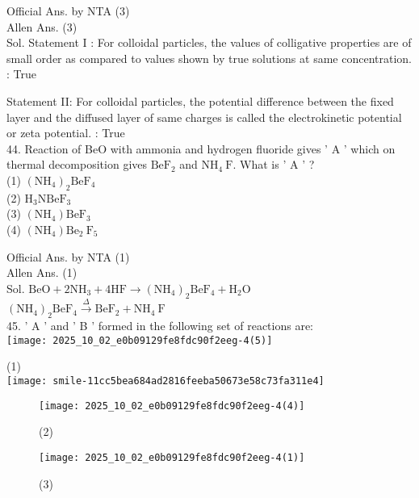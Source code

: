 \documentclass[10pt]{article}
\begin{document}
Official Ans. by NTA (3)\\
Allen Ans. (3)\\
Sol. Statement I : For colloidal particles, the values of colligative properties are of small order as compared to values shown by true solutions at same concentration. : True

Statement II: For colloidal particles, the potential difference between the fixed layer and the diffused layer of same charges is called the electrokinetic potential or zeta potential. : True\\
44. Reaction of BeO with ammonia and hydrogen fluoride gives ' A ' which on thermal decomposition gives \(\mathrm{BeF}_{2}\) and \(\mathrm{NH}_{4} \mathrm{~F}\). What is ' A ' ?\\
(1) \(\left(\mathrm{NH}_{4}\right)_{2} \mathrm{BeF}_{4}\)\\
(2) \(\mathrm{H}_{3} \mathrm{NBeF}_{3}\)\\
(3) \(\left(\mathrm{NH}_{4}\right) \mathrm{BeF}_{3}\)\\
(4) \(\left(\mathrm{NH}_{4}\right) \mathrm{Be}_{2} \mathrm{~F}_{5}\)

Official Ans. by NTA (1)\\
Allen Ans. (1)\\
Sol. \(\mathrm{BeO}+2 \mathrm{NH}_{3}+4 \mathrm{HF} \rightarrow\left(\mathrm{NH}_{4}\right)_{2} \mathrm{BeF}_{4}+\mathrm{H}_{2} \mathrm{O}\)\\
\(\left(\mathrm{NH}_{4}\right)_{2} \mathrm{BeF}_{4} \xrightarrow{\Delta} \mathrm{BeF}_{2}+\mathrm{NH}_{4} \mathrm{~F}\)\\
45. ' A ' and ' B ' formed in the following set of reactions are:\\
\texttt{[image: 2025\_10\_02\_e0b09129fe8fdc90f2eeg-4(5)]}

(1)\\
\texttt{[image: smile-11cc5bea684ad2816feeba50673e58c73fa311e4]}

\begin{figure}[h]
\begin{center}
\captionsetup{labelformat=empty}
\caption{(2)}
  \texttt{[image: 2025\_10\_02\_e0b09129fe8fdc90f2eeg-4(4)]}
\end{center}
\end{figure}

\begin{figure}[h]
\begin{center}
\captionsetup{labelformat=empty}
\caption{(3)}
  \texttt{[image: 2025\_10\_02\_e0b09129fe8fdc90f2eeg-4(1)]}
\end{center}
\end{figure}
\end{document}
